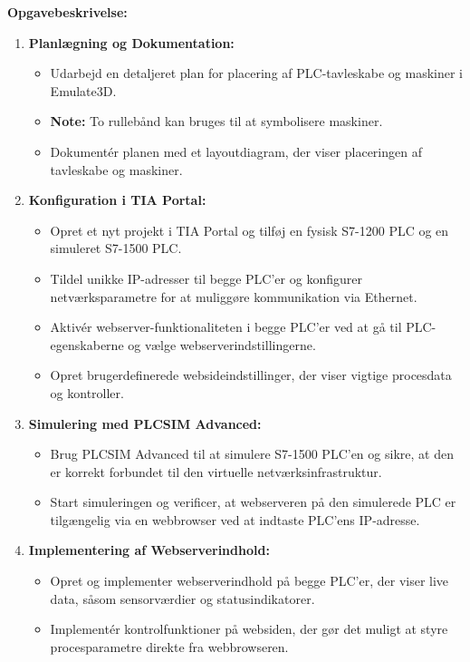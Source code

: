 \noindent\textbf{Opgavebeskrivelse:}
\begin{enumerate}
	\item \textbf{Planlægning og Dokumentation:}
	\begin{itemize}
		\item Udarbejd en detaljeret plan for placering af PLC-tavleskabe og maskiner i Emulate3D. 
		\item \textbf{Note:} To rullebånd kan bruges til at symbolisere maskiner.
		\item Dokumentér planen med et layoutdiagram, der viser placeringen af tavleskabe og maskiner.
	\end{itemize}
	
	\item \textbf{Konfiguration i TIA Portal:}
	\begin{itemize}
		\item Opret et nyt projekt i TIA Portal og tilføj en fysisk S7-1200 PLC og en simuleret S7-1500 PLC.
		\item Tildel unikke IP-adresser til begge PLC'er og konfigurer netværksparametre for at muliggøre kommunikation via Ethernet.
		\item Aktivér webserver-funktionaliteten i begge PLC'er ved at gå til PLC-egenskaberne og vælge webserverindstillingerne.
		\item Opret brugerdefinerede websideindstillinger, der viser vigtige procesdata og kontroller.
	\end{itemize}
	
	\item \textbf{Simulering med PLCSIM Advanced:}
	\begin{itemize}
		\item Brug PLCSIM Advanced til at simulere S7-1500 PLC'en og sikre, at den er korrekt forbundet til den virtuelle netværksinfrastruktur.
		\item Start simuleringen og verificer, at webserveren på den simulerede PLC er tilgængelig via en webbrowser ved at indtaste PLC'ens IP-adresse.
	\end{itemize}
	
	\item \textbf{Implementering af Webserverindhold:}
	\begin{itemize}
		\item Opret og implementer webserverindhold på begge PLC'er, der viser live data, såsom sensorværdier og statusindikatorer.
		\item Implementér kontrolfunktioner på websiden, der gør det muligt at styre procesparametre direkte fra webbrowseren.
	\end{itemize}
	

\end{enumerate}
